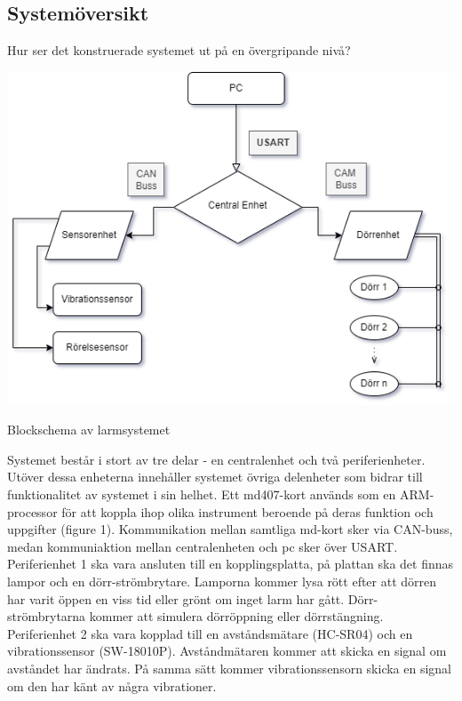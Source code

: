 \documentclass{article}
\begin{document}
\subsection{Systemöversikt}
Hur ser det konstruerade systemet ut på en övergripande nivå?

\newpage

\includegraphics[scale=0.6]{Projektrapport/diagram.png}
\caption {Blockschema av larmsystemet}
\label{fig:drawing}


Systemet består i stort av tre delar - en centralenhet och två periferienheter. Utöver dessa enheterna innehåller systemet övriga delenheter som bidrar till funktionalitet av systemet i sin helhet. Ett md407-kort används som en ARM-processor för att koppla ihop olika instrument beroende på deras funktion och uppgifter (figure 1). Kommunikation mellan samtliga md-kort sker via CAN-buss, medan kommuniaktion mellan centralenheten och pc sker över USART. \\


Periferienhet 1 ska vara ansluten till en kopplingsplatta, på plattan ska det finnas lampor och en dörr-strömbrytare. Lamporna kommer lysa rött efter att dörren har varit öppen en viss tid eller grönt om inget larm har gått. Dörr-strömbrytarna kommer att simulera dörröppning eller dörrstängning. \\

Periferienhet 2 ska vara kopplad till en avståndsmätare (HC-SR04) och en vibrationssensor (SW-18010P). Avståndmätaren kommer att skicka en signal om avståndet har ändrats. På samma sätt kommer vibrationssensorn skicka en signal om den har känt av några vibrationer. \\
\end{document}
